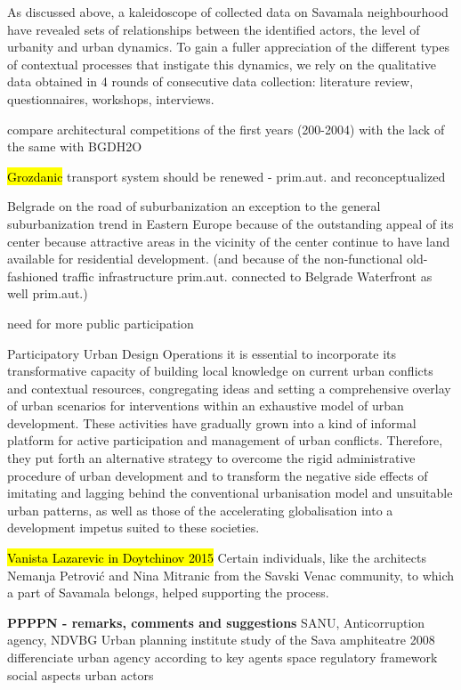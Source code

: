 \documentclass[11pt]{report}
\begin{document}
As discussed above, a kaleidoscope of collected data on Savamala neighbourhood have revealed sets of relationships between the identified actors, the level of urbanity and urban dynamics. To gain a fuller appreciation of the different types of contextual processes that instigate this dynamics, we rely on the qualitative data obtained in 4 rounds of consecutive data collection: literature review, questionnaires, workshops, interviews. 

compare architectural competitions of the first years (200-2004) \cite{Stupar} with the lack of the same with BGDH2O

\hl{Grozdanic}
transport system should be renewed -  prim.aut. and reconceptualized

\cite{(Hirt 2009)}
Belgrade on the road of suburbanization
an exception to the general suburbanization trend in Eastern Europe  because of the outstanding appeal of its center because attractive areas in the vicinity of the center continue to have land available for residential development. (and because of the non-functional old-fashioned traffic infrastructure prim.aut. connected to Belgrade Waterfront as well prim.aut.)

need for more public participation

Participatory Urban Design Operations
it is essential to incorporate its transformative capacity of building local knowledge on current urban conflicts and contextual resources, congregating ideas and setting a comprehensive overlay of urban scenarios for interventions within an exhaustive model of urban development.
These activities have gradually grown into a kind of informal platform for active participation and management of urban conflicts. Therefore, they put forth an alternative strategy to overcome the rigid administrative procedure of urban development and to transform the negative side effects of imitating and lagging behind the conventional urbanisation model and unsuitable urban patterns, as well as those of the accelerating globalisation into a development impetus suited to these societies.

\hl{Vanista Lazarevic in Doytchinov 2015}
Certain  individuals,  like  the  architects  Nemanja Petrović  and  Nina  Mitranic  from  the  Savski  Venac community,  to  which  a  part  of  Savamala  belongs, helped supporting the process.

\textbf{PPPPN - remarks, comments and suggestions}
SANU, Anticorruption agency, NDVBG
Urban planning institute study of the Sava amphiteatre 2008
differenciate urban agency according to key agents
space
regulatory framework
social aspects
urban actors
\end{document}
